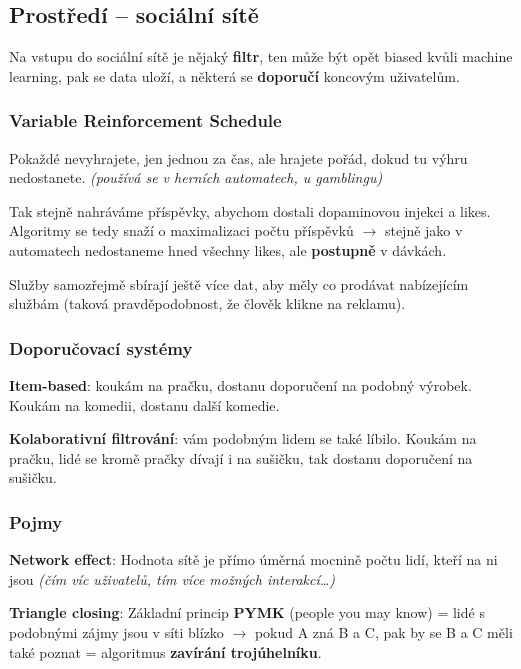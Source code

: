\subsection{Prostředí -- sociální sítě}

Na vstupu do sociální sítě je nějaký \textbf{filtr}, ten může být opět biased kvůli machine learning, pak se data uloží, a některá se \textbf{doporučí} koncovým uživatelům.

\subsubsection*{Variable Reinforcement Schedule}

Pokaždé nevyhrajete, jen jednou za čas, ale hrajete pořád, dokud tu výhru nedostanete. \textit{(používá se v herních automatech, u gamblingu)}

\vspace{4pt}
\noindent Tak stejně nahráváme příspěvky, abychom dostali dopaminovou injekci a likes. Algoritmy se tedy snaží o maximalizaci počtu příspěvků $\to$ stejně jako v automatech nedostaneme hned všechny likes, ale \textbf{postupně} v dávkách.

\vspace{4pt}
\noindent Služby samozřejmě sbírají ještě více dat, aby měly co prodávat nabízejícím službám (taková pravděpodobnost, že člověk klikne na reklamu).

\subsubsection*{Doporučovací systémy}

\textbf{Item-based}: koukám na pračku, dostanu doporučení na podobný výrobek. Koukám na komedii, dostanu další komedie.

\vspace{4pt}
\noindent \textbf{Kolaborativní filtrování}: vám podobným lidem se také líbilo. Koukám na pračku, lidé se kromě pračky dívají i na sušičku, tak dostanu doporučení na sušičku.

\subsubsection*{Pojmy}

\textbf{Network effect}: Hodnota sítě je přímo úměrná mocnině počtu lidí, kteří na ni jsou \textit{(čím víc uživatelů, tím více možných interakcí\ldots)}

\vspace{4pt}
\noindent \textbf{Triangle closing}: Základní princip \textbf{PYMK} (people you may know) = lidé s podobnými zájmy jsou v síti blízko $\to$ pokud A zná B a C, pak by se B a C měli také poznat = algoritmus \textbf{zavírání trojúhelníku}.

